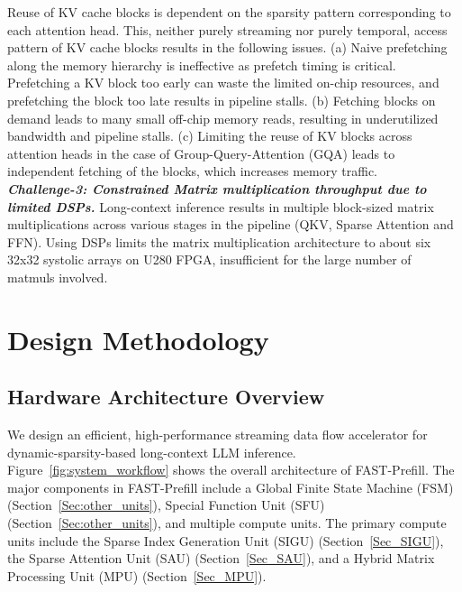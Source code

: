 \documentclass[conference]{IEEEtran}
\begin{document}
Reuse of KV cache blocks is dependent on the sparsity pattern corresponding to each attention head. This, neither purely streaming nor purely temporal, access pattern of KV cache blocks results in the following issues. (a) Naive prefetching along the memory hierarchy is ineffective as prefetch timing is critical. Prefetching a KV block too early can waste the limited on-chip resources, and prefetching the block too late results in pipeline stalls. (b) Fetching blocks on demand leads to many small off-chip memory reads, resulting in underutilized bandwidth and pipeline stalls. (c) Limiting the reuse of KV blocks across attention heads in the case of Group-Query-Attention (GQA) leads to independent fetching of the blocks, which increases memory traffic.\\
\textbf{\textit{Challenge-3: Constrained Matrix multiplication throughput due to limited DSPs.}} 
Long-context inference results in multiple block-sized matrix multiplications across various stages in the pipeline (QKV, Sparse Attention and FFN). Using DSPs limits the matrix multiplication architecture to about six 32x32 systolic arrays on U280 FPGA, insufficient for the large number of matmuls involved.

\section{Design Methodology}

\subsection{Hardware Architecture Overview} 
We design an efficient, high-performance streaming data flow accelerator for dynamic-sparsity-based long-context LLM inference. Figure~\ref{fig:system_workflow} shows the overall architecture of FAST-Prefill. The major components in FAST-Prefill include a Global Finite State Machine (FSM) (Section~\ref{Sec:other_units}), Special Function Unit (SFU)(Section~\ref{Sec:other_units}), and multiple compute units. The primary compute units include the Sparse Index Generation Unit (SIGU) (Section~\ref{Sec_SIGU}), the Sparse Attention Unit (SAU) (Section~\ref{Sec_SAU}), and a Hybrid Matrix Processing Unit (MPU) (Section~\ref{Sec_MPU}).
\end{document}
